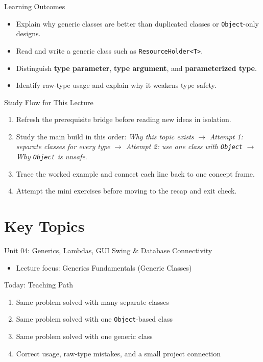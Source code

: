 \documentclass{beamer}
\begin{document}
\begin{frame}{Learning Outcomes}
  \begin{itemize}[<+->]
    \item Explain why generic classes are better than duplicated classes or \texttt{Object}-only designs.
    \item Read and write a generic class such as \texttt{ResourceHolder<T>}.
    \item Distinguish \textbf{type parameter}, \textbf{type argument}, and \textbf{parameterized type}.
    \item Identify raw-type usage and explain why it weakens type safety.
  \end{itemize}
  \slidesources{\OOPSUnitIVSources}
\end{frame}

\begin{frame}{Study Flow for This Lecture}
\begin{enumerate}[<+->]
  \item Refresh the prerequisite bridge before reading new ideas in isolation.
  \item Study the main build in this order: \textit{Why this topic exists} $\rightarrow$ \textit{Attempt 1: separate classes for every type} $\rightarrow$ \textit{Attempt 2: use one class with \texttt{Object}} $\rightarrow$ \textit{Why \texttt{Object} is unsafe}.
  \item Trace the worked example and connect each line back to one concept frame.
  \item Attempt the mini exercises before moving to the recap and exit check.
\end{enumerate}
  \slidesources{\OOPSUnitIVSources}
\end{frame}


\section{Key Topics}
\label{sec:concepts}

\begin{frame}{Unit 04: Generics, Lambdas, GUI Swing \& Database Connectivity}
  \begin{itemize}[<+->]
    \item Lecture focus: Generics Fundamentals (Generic Classes)
  \end{itemize}
  \slidesources{\OOPSUnitIVSources}
\end{frame}

\begin{frame}{Today: Teaching Path}
  \begin{enumerate}[<+->]
    \item Same problem solved with many separate classes
    \item Same problem solved with one \texttt{Object}-based class
    \item Same problem solved with one generic class
    \item Correct usage, raw-type mistakes, and a small project connection
  \end{enumerate}
  \slidesources{\OOPSUnitIVSources}
\end{frame}
\end{document}
